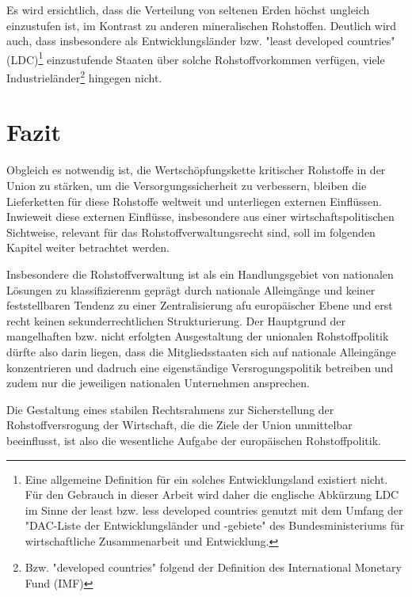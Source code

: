 \documentclass[12pt,a4paper,oneside]{book} %
\begin{document}
	
	Es wird ersichtlich, dass die Verteilung von seltenen Erden höchst ungleich einzustufen ist, im Kontrast zu anderen mineralischen Rohstoffen. Deutlich wird auch, dass insbesondere als Entwicklungsländer bzw. "least developed countries" (LDC)\footnote{Eine allgemeine Definition für ein solches Entwicklungsland existiert nicht. Für den Gebrauch in dieser Arbeit wird daher die englische Abkürzung LDC im Sinne der least bzw. less developed countries genutzt mit dem Umfang der "DAC-Liste der Entwicklungsländer und -gebiete" des Bundesministeriums für wirtschaftliche Zusammenarbeit und Entwicklung.} einzustufende Staaten über solche Rohstoffvorkommen verfügen, viele Industrieländer\footnote{Bzw. "developed countries"  folgend der Definition des International Monetary Fund (IMF)} hingegen nicht. 
	
	\section{Fazit}
	Obgleich es notwendig ist, die Wertschöpfungskette kritischer Rohstoffe in der Union zu stärken, um die Versorgungssicherheit zu verbessern, bleiben die Lieferketten für diese Rohstoffe weltweit und unterliegen externen Einflüssen. Inwieweit diese externen Einflüsse, insbesondere aus einer wirtschaftspolitischen Sichtweise, relevant für das Rohstoffverwaltungsrecht sind, soll im folgenden Kapitel weiter betrachtet werden.
	
	Insbesondere die Rohstoffverwaltung ist als ein Handlungsgebiet von nationalen Lösungen zu klassifizierenm geprägt durch nationale Alleingänge und keiner feststellbaren Tendenz zu einer Zentralisierung afu europäischer Ebene und erst recht keinen sekunderrechtlichen Strukturierung. Der Hauptgrund der mangelhaften bzw. nicht erfolgten Ausgestaltung der unionalen Rohstoffpolitik dürfte also darin liegen, dass die Mitgliedsstaaten sich auf nationale Alleingänge konzentrieren und dadruch eine eigenständige Versrogungspolitik betreiben und zudem nur die jeweiligen nationalen Unternehmen ansprechen.
	
	Die Gestaltung eines stabilen Rechtsrahmens zur Sicherstellung der Rohstoffversrogung der Wirtschaft, die die Ziele der Union unmittelbar beeinflusst, ist also die wesentliche Aufgabe der europäischen Rohstoffpolitik.
	
\end{document}
